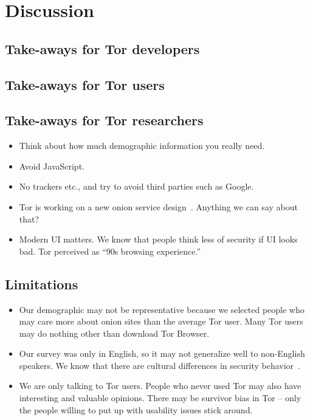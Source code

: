 \section{Discussion}
\label{sec:discussion}

\subsection{Take-aways for Tor developers}
\subsection{Take-aways for Tor users}
\subsection{Take-aways for Tor researchers}
\begin{itemize}
    \item Think about how much demographic information you really need.
    \item Avoid JavaScript.
    \item No trackers etc., and try to avoid third parties such as Google.
\end{itemize}

\begin{itemize}
    \item Tor is working on a new onion service design~\cite{Mathewson2013a}.
        Anything we can say about that?
    \item Modern UI matters.  We know that people think less of security if UI
        looks bad.  Tor perceived as ``90s browsing experience.''
\end{itemize}

\subsection{Limitations}
\begin{itemize}
    \item Our demographic may not be representative because we selected people
        who may care more about onion sites than the average Tor user.  Many
        Tor users may do nothing other than download Tor Browser.
    \item Our survey was only in English, so it may not generalize well to
        non-English speakers.  We know that there are cultural differences in
        security behavior~\cite{Sawaya2017a}.
    \item We are only talking to Tor users.  People who never used Tor may also
        have interesting and valuable opinions.  There may be survivor bias in
        Tor -- only the people willing to put up with usability issues stick
        around.
\end{itemize}
